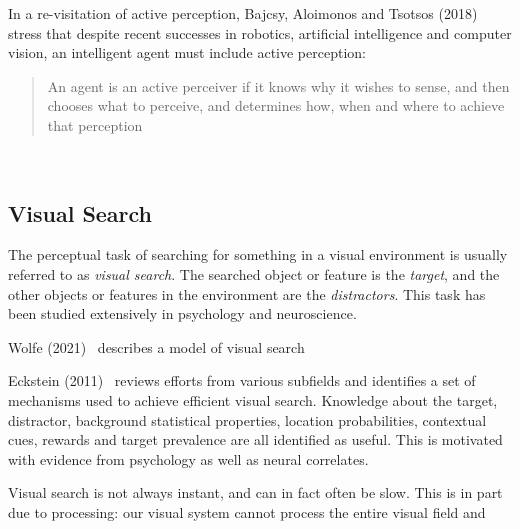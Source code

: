 In a re-visitation of active perception, Bajcsy, Aloimonos and Tsotsos (2018)~\cite{bajcsy_aloimonos_tsotsos_2018} stress that despite recent successes in robotics, artificial intelligence and computer vision, an intelligent agent must include active perception:

\begin{quote}
    An agent is an active perceiver if it knows why it wishes to sense, and then chooses what to perceive, and determines how, when and where to achieve that perception
\end{quote}~\cite{bajcsy_aloimonos_tsotsos_2018}


\subsection{Visual Search}
\label{sec:visualsearch}


The perceptual task of searching for something in a visual environment is usually referred to as \textit{visual search}.
The searched object or feature is the \textit{target}, and the other objects or features in the environment are the \textit{distractors}.
This task has been studied extensively in psychology and neuroscience.

Wolfe (2021)~\cite{wolfe_guided_2021} describes a model of visual search


Eckstein (2011)~\cite{eckstein_visual_2011} reviews efforts from various subfields and identifies a set of mechanisms used to achieve efficient visual search.
Knowledge about the target, distractor, background statistical properties, location probabilities, contextual cues, rewards and target prevalence are all identified as useful.
This is motivated with evidence from psychology as well as neural correlates.

Visual search is not always instant, and can in fact often be slow.
This is in part due to processing: our visual system cannot process the entire visual field and 


